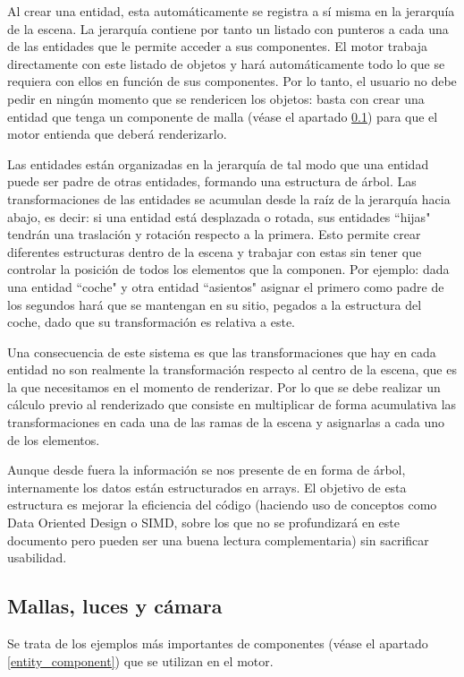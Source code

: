 Al crear una entidad, esta automáticamente se registra a sí misma en la jerarquía de la escena. La jerarquía contiene por tanto un listado con punteros a cada una de las entidades que le permite acceder a sus componentes. El motor trabaja directamente con este listado de objetos y hará automáticamente todo lo que se requiera con ellos en función de sus componentes. Por lo tanto, el usuario no debe pedir en ningún momento que se rendericen los objetos: basta con crear una entidad que tenga un componente de malla (véase el apartado \ref{mesh_light_cam}) para que el motor entienda que deberá renderizarlo.

Las entidades están organizadas en la jerarquía de tal modo que una entidad puede ser padre de otras entidades, formando una estructura de árbol. Las transformaciones de las entidades se acumulan desde la raíz de la jerarquía hacia abajo, es decir: si una entidad está desplazada o rotada, sus entidades ``hijas" tendrán una traslación y rotación respecto a la primera. Esto permite crear diferentes estructuras dentro de la escena y trabajar con estas sin tener que controlar la posición de todos los elementos que la componen. Por ejemplo: dada una entidad ``coche" y otra entidad ``asientos" asignar el primero como padre de los segundos hará que se mantengan en su sitio, pegados a la estructura del coche, dado que su transformación es relativa a este.

Una consecuencia de este sistema es que las transformaciones que hay en cada entidad no son realmente la transformación respecto al centro de la escena, que es la que necesitamos en el momento de renderizar. Por lo que se debe realizar un cálculo previo al renderizado que consiste en multiplicar de forma acumulativa las transformaciones en cada una de las ramas de la escena y asignarlas a cada uno de los elementos.

Aunque desde fuera la información se nos presente de en forma de árbol, internamente los datos están estructurados en arrays. El objetivo de esta estructura es mejorar la eficiencia del código (haciendo uso de conceptos como Data Oriented Design o SIMD, sobre los que no se profundizará en este documento pero pueden ser una buena lectura complementaria) sin sacrificar usabilidad.

\subsection{Mallas, luces y cámara}
\label{mesh_light_cam}
Se trata de los ejemplos más importantes de componentes (véase el apartado \ref{entity_component}) que se utilizan en el motor.

